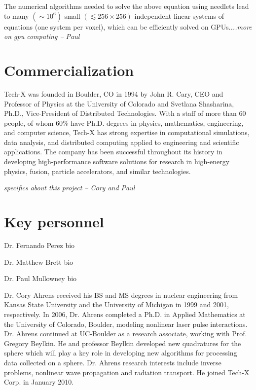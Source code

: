 \documentclass[10pt]{article}
\begin{document}
The numerical algorithms needed to solve the above equation using needlets lead to many $(\sim 10^6)$ small $(\lesssim 256\times256)$ independent linear systems of equations (one system per voxel), which can be efficiently solved on GPUs.\emph{...more on gpu computing -- Paul}

\section*{Commercialization}
Tech-X was founded in Boulder, CO in 1994 by John R. Cary, CEO and Professor of Physics at the University of Colorado and Svetlana Shasharina, Ph.D., Vice-President of Distributed Technologies. With a staff of more than 60 people, of whom 60\% have Ph.D. degrees in physics, mathematics, engineering, and computer science, Tech-X has strong expertise in computational simulations, data analysis, and distributed computing applied to engineering and scientific applications.  The company has been successful throughout its history in developing high-performance software solutions for research in high-energy physics, fusion, particle accelerators, and similar technologies.

\emph{specifics about this project -- Cory and Paul}

\section*{Key personnel}

Dr. Fernando Perez bio

Dr. Matthew Brett bio

Dr. Paul Mullowney bio

Dr. Cory Ahrens received his BS and MS degrees in nuclear engineering from Kansas State University and the University of Michigan in 1999 and 2001, respectively. In 2006, Dr. Ahrens completed a Ph.D. in Applied Mathematics at the University of Colorado, Boulder, modeling nonlinear laser pulse interactions. Dr. Ahrens continued at UC-Boulder as a research associate, working with Prof. Gregory Beylkin. He and professor Beylkin developed new quadratures for the sphere which will play a key role in developing new algorithms for processing data collected on a sphere. Dr. Ahrens research interests include inverse problems, nonlinear wave propagation and radiation transport. He joined Tech-X Corp. in January 2010.



 
\end{document}
